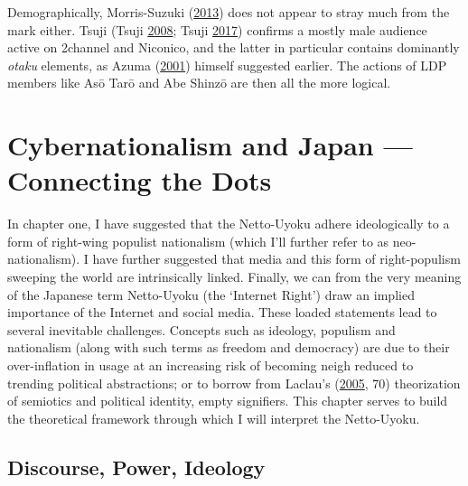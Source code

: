 \documentclass[10pt,british,A4paper,,openany]{memoir}
\begin{document}
Demographically, Morris-Suzuki
(\protect\hyperlink{ref-morris-suzuki_freedom_2013}{2013}) does not
appear to stray much from the mark either. Tsuji (Tsuji
\protect\hyperlink{ref-tsuji_eng:_2008}{2008}; Tsuji
\protect\hyperlink{ref-tsuji_eng._2017}{2017}) confirms a mostly male
audience active on 2channel and Niconico, and the latter in particular
contains dominantly \emph{otaku} elements, as Azuma
(\protect\hyperlink{ref-azuma_otaku:_2001}{2001}) himself suggested
earlier. The actions of LDP members like Asō Tarō and Abe Shinzō are
then all the more logical.

\chapter{Cybernationalism and Japan --- Connecting the
Dots}\label{cybernationalism-and-japan-connecting-the-dots}

In chapter one, I have suggested that the Netto-Uyoku adhere
ideologically to a form of right-wing populist nationalism (which I'll
further refer to as neo-nationalism). I have further suggested that
media and this form of right-populism sweeping the world are
intrinsically linked. Finally, we can from the very meaning of the
Japanese term Netto-Uyoku (the `Internet Right') draw an implied
importance of the Internet and social media. These loaded statements
lead to several inevitable challenges. Concepts such as ideology,
populism and nationalism (along with such terms as freedom and
democracy) are due to their over-inflation in usage at an increasing
risk of becoming neigh reduced to trending political abstractions; or to
borrow from Laclau's
(\protect\hyperlink{ref-laclau_populist_2005}{2005}, 70) theorization of
semiotics and political identity, empty signifiers. This chapter serves
to build the theoretical framework through which I will interpret the
Netto-Uyoku.

\section{Discourse, Power, Ideology}\label{discourse-power-ideology}
\end{document}
